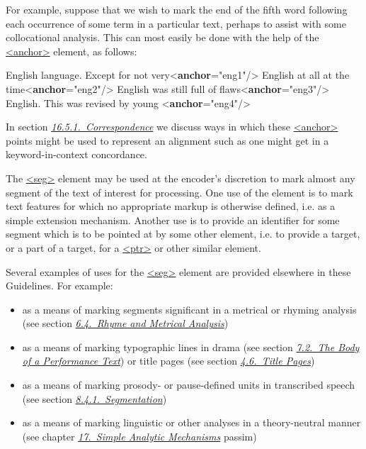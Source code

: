 For example, suppose that we wish to mark the end of the fifth word following each occurrence of some term in a particular text, perhaps to assist with some collocational analysis. This can most easily be done with the help of the \hyperref[TEI.anchor]{<anchor>} element, as follows:  \par\bgroup{}\exampleFont \begin{shaded}\noindent\mbox{}English language. Except for not very{<\textbf{anchor}\hspace*{1em}{xml:id}="{eng1}"/>}\mbox{}\newline 
 English at all at the time{<\textbf{anchor}\hspace*{1em}{xml:id}="{eng2}"/>}\mbox{}\newline 
 English was still full of flaws{<\textbf{anchor}\hspace*{1em}{xml:id}="{eng3}"/>}\mbox{}\newline 
 English. This was revised by young\mbox{}\newline 
{<\textbf{anchor}\hspace*{1em}{xml:id}="{eng4}"/>}\end{shaded}\egroup\par \noindent  In section \textit{\hyperref[SACS1]{16.5.1.\ Correspondence}} we discuss ways in which these \hyperref[TEI.anchor]{<anchor>} points might be used to represent an alignment such as one might get in a keyword-in-context concordance.\par
The \hyperref[TEI.seg]{<seg>} element may be used at the encoder's discretion to mark almost any segment of the text of interest for processing. One use of the element is to mark text features for which no appropriate markup is otherwise defined, i.e. as a simple extension mechanism. Another use is to provide an identifier for some segment which is to be pointed at by some other element, i.e. to provide a target, or a part of a target, for a \hyperref[TEI.ptr]{<ptr>} or other similar element.\par
Several examples of uses for the \hyperref[TEI.seg]{<seg>} element are provided elsewhere in these Guidelines. For example: \begin{itemize}
\item as a means of marking segments significant in a metrical or rhyming analysis (see section \textit{\hyperref[VEME]{6.4.\ Rhyme and Metrical Analysis}})
\item as a means of marking typographic lines in drama (see section \textit{\hyperref[DRBOD]{7.2.\ The Body of a Performance Text}}) or title pages (see section \textit{\hyperref[DSTITL]{4.6.\ Title Pages}})
\item as a means of marking prosody- or pause-defined units in transcribed speech (see section \textit{\hyperref[TSSASE]{8.4.1.\ Segmentation}})
\item as a means of marking linguistic or other analyses in a theory-neutral manner (see chapter \textit{\hyperref[AI]{17.\ Simple Analytic Mechanisms}} passim)
\end{itemize} \par
